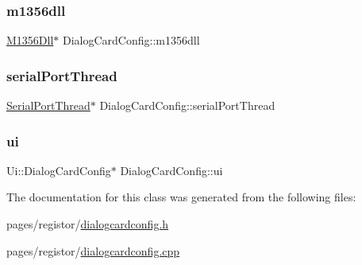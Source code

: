\mbox{\label{class_dialog_card_config_a16e843ba7a55cbe43b35ee7459d8d464}} 
\subsubsection{\texorpdfstring{m1356dll}{m1356dll}}
{\footnotesize\ttfamily \mbox{\hyperlink{class_m1356_dll}{M1356\+Dll}}$\ast$ Dialog\+Card\+Config\+::m1356dll\hspace{0.3cm}{\ttfamily [private]}}

\mbox{\label{class_dialog_card_config_a03f0f53a1f6324827d54b5cc334994a2}} 
\subsubsection{\texorpdfstring{serialPortThread}{serialPortThread}}
{\footnotesize\ttfamily \mbox{\hyperlink{class_serial_port_thread}{Serial\+Port\+Thread}}$\ast$ Dialog\+Card\+Config\+::serial\+Port\+Thread\hspace{0.3cm}{\ttfamily [private]}}

\mbox{\label{class_dialog_card_config_a8eb08fb2f9189dc187da2d942d53838f}} 
\subsubsection{\texorpdfstring{ui}{ui}}
{\footnotesize\ttfamily Ui\+::\+Dialog\+Card\+Config$\ast$ Dialog\+Card\+Config\+::ui\hspace{0.3cm}{\ttfamily [private]}}



The documentation for this class was generated from the following files\+:\begin{DoxyCompactItemize}
\item 
pages/registor/\mbox{\hyperlink{dialogcardconfig_8h}{dialogcardconfig.\+h}}\item 
pages/registor/\mbox{\hyperlink{dialogcardconfig_8cpp}{dialogcardconfig.\+cpp}}\end{DoxyCompactItemize}

